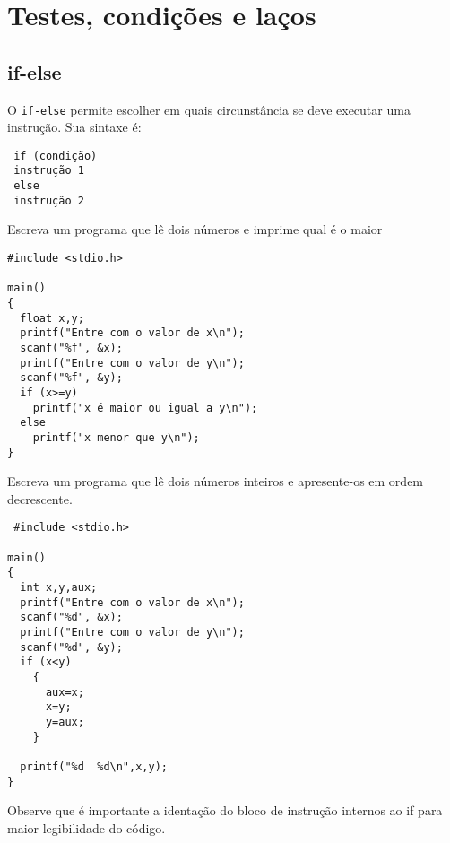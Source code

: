
\chapter{Testes, condições e laços}
\section{if-else}
O \verb|if-else| permite escolher em quais circunstância se deve executar uma instrução. Sua sintaxe é: 
\begin{verbatim}
 if (condição)
 instrução 1
 else
 instrução 2
\end{verbatim}
\begin{ex}\label{ex5}Escreva um programa que lê dois números e imprime qual é o maior
 
\end{ex}

\begin{verbatim}
#include <stdio.h>

main()
{
  float x,y;
  printf("Entre com o valor de x\n");
  scanf("%f", &x);
  printf("Entre com o valor de y\n");
  scanf("%f", &y);
  if (x>=y)
    printf("x é maior ou igual a y\n");
  else
    printf("x menor que y\n");
}
\end{verbatim}
\begin{ex}\label{ex6}Escreva um programa que lê dois números inteiros e apresente-os em ordem decrescente.
\end{ex}
\begin{verbatim}
 #include <stdio.h>

main()
{
  int x,y,aux;
  printf("Entre com o valor de x\n");
  scanf("%d", &x);
  printf("Entre com o valor de y\n");
  scanf("%d", &y);
  if (x<y)
    {
      aux=x;
      x=y;
      y=aux;
    }

  printf("%d  %d\n",x,y);
}
\end{verbatim}
Observe que é importante a identação do bloco de instrução internos ao if para maior legibilidade do código.

